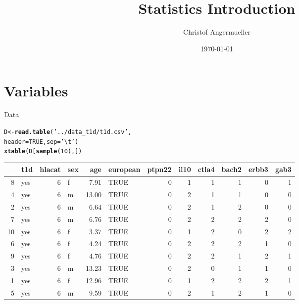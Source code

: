 \documentclass{beamer}\usepackage[]{graphicx}\usepackage[]{color}
\author{Christof Angermueller}
\title{Statistics Introduction}
\date{\today}
\makeatletter
\newcommand{\hlnum}[1]{\textcolor[rgb]{0.686,0.059,0.569}{#1}}%
\newcommand{\hlstr}[1]{\textcolor[rgb]{0.192,0.494,0.8}{#1}}%
\newcommand{\hlstd}[1]{\textcolor[rgb]{0.345,0.345,0.345}{#1}}%
\newcommand{\hlkwb}[1]{\textcolor[rgb]{0.69,0.353,0.396}{#1}}%
\newcommand{\hlkwc}[1]{\textcolor[rgb]{0.333,0.667,0.333}{#1}}%
\newcommand{\hlkwd}[1]{\textcolor[rgb]{0.737,0.353,0.396}{\textbf{#1}}}%
\newenvironment{kframe}{%
 \def\at@end@of@kframe{}%
 \ifinner\ifhmode%
  \def\at@end@of@kframe{\end{minipage}}%
  \begin{minipage}{\columnwidth}%
 \fi\fi%
 \def\FrameCommand##1{\hskip\@totalleftmargin \hskip-\fboxsep
 \colorbox{shadecolor}{##1}\hskip-\fboxsep
     \hskip-\linewidth \hskip-\@totalleftmargin \hskip\columnwidth}%
 \MakeFramed {\advance\hsize-\width
   \@totalleftmargin\z@ \linewidth\hsize
   \@setminipage}}%
 {\par\unskip\endMakeFramed%
 \at@end@of@kframe}
\makeatother
\begin{document}
\section{Variables}

\begin{frame}[fragile]{Data}
\begin{kframe}
\begin{alltt}
\hlstd{D} \hlkwb{<-} \hlkwd{read.table}\hlstd{(}\hlstr{'../data_t1d/t1d.csv'}\hlstd{,}
                \hlkwc{header}\hlstd{=}\hlnum{TRUE}\hlstd{,} \hlkwc{sep}\hlstd{=}\hlstr{'\textbackslash{}t'}\hlstd{)}
\hlkwd{xtable}\hlstd{(D[}\hlkwd{sample}\hlstd{(}\hlnum{10}\hlstd{),])}
\end{alltt}
\end{kframe}%
\begin{table}[ht]
\centering
\begin{tabular}{rlrlrlrrrrrr}
  \hline
 & t1d & hlacat & sex & age & european & ptpn22 & il10 & ctla4 & bach2 & erbb3 & gab3 \\ 
  \hline
8 & yes &   6 & f & 7.91 & TRUE &   0 &   1 &   1 &   1 &   0 &   1 \\ 
  4 & yes &   6 & m & 13.00 & TRUE &   0 &   2 &   1 &   1 &   0 &   0 \\ 
  2 & yes &   6 & m & 6.64 & TRUE &   0 &   2 &   1 &   2 &   0 &   0 \\ 
  7 & yes &   6 & m & 6.76 & TRUE &   0 &   2 &   2 &   2 &   2 &   0 \\ 
  10 & yes &   6 & f & 3.37 & TRUE &   0 &   1 &   2 &   0 &   2 &   2 \\ 
  6 & yes &   6 & f & 4.24 & TRUE &   0 &   2 &   2 &   2 &   1 &   0 \\ 
  9 & yes &   6 & f & 4.76 & TRUE &   0 &   2 &   2 &   1 &   2 &   1 \\ 
  3 & yes &   6 & m & 13.23 & TRUE &   0 &   2 &   0 &   1 &   1 &   0 \\ 
  1 & yes &   6 & f & 12.96 & TRUE &   0 &   1 &   2 &   2 &   2 &   1 \\ 
  5 & yes &   6 & m & 9.59 & TRUE &   0 &   2 &   1 &   2 &   1 &   0 \\ 
   \hline
\end{tabular}
\end{table}

\end{frame}
\end{document}
